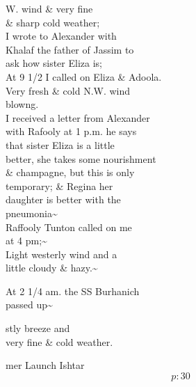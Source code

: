 \documentclass{report}
\begin{document}

	\par{
 	W. wind \& very fine\ \\\& sharp cold weather;\ \\I wrote to Alexander with\ \\Khalaf the father of Jassim to\ \\ask how sister Eliza is;\ \\At 9 1/2 I called on Eliza \& Adoola.\ \\Very fresh \& cold N.W. wind\ \\blowng.\ \\I received a letter from Alexander\ \\with Rafooly at 1 p.m. he says\ \\that sister Eliza is a little\ \\better, she takes some nourishment\ \\\& champagne, but this is only\ \\temporary; \& Regina her\ \\daughter is better with the\ \\pneumonia\~{}\ \\Raffooly Tunton called on me\ \\at 4 pm;\~{}\ \\Light westerly wind and a\ \\little cloudy \& hazy.\~{}\ \\
	}


	\par{
 	At 2 1/4 am. the SS Burhanich\ \\passed up\~{}\ \\
	}

	\par{
 	stly breeze and\ \\very fine \& cold weather.\ \\
	}

	\par{
 	mer Launch Ishtar\ \\
  \[p: 30 \]

	}
\end{document}
